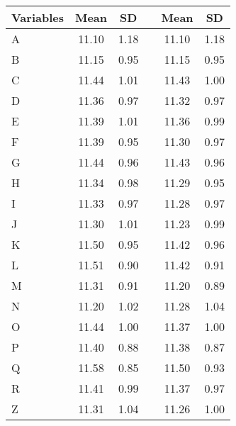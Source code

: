 \begin{tabular}{lccccc}
\toprule
    Variables &  Mean &   SD &  \multicolumn{1}{l}{} &  Mean &   SD \\
\midrule
\hspace{3mm}A & 11.10 & 1.18 &                       & 11.10 & 1.18 \\
\hspace{3mm}B & 11.15 & 0.95 &                       & 11.15 & 0.95 \\
\hspace{3mm}C & 11.44 & 1.01 &                       & 11.43 & 1.00 \\
\hspace{3mm}D & 11.36 & 0.97 &                       & 11.32 & 0.97 \\
\hspace{3mm}E & 11.39 & 1.01 &                       & 11.36 & 0.99 \\
\hspace{3mm}F & 11.39 & 0.95 &                       & 11.30 & 0.97 \\
\hspace{3mm}G & 11.44 & 0.96 &                       & 11.43 & 0.96 \\
\hspace{3mm}H & 11.34 & 0.98 &                       & 11.29 & 0.95 \\
\hspace{3mm}I & 11.33 & 0.97 &                       & 11.28 & 0.97 \\
\hspace{3mm}J & 11.30 & 1.01 &                       & 11.23 & 0.99 \\
\hspace{3mm}K & 11.50 & 0.95 &                       & 11.42 & 0.96 \\
\hspace{3mm}L & 11.51 & 0.90 &                       & 11.42 & 0.91 \\
\hspace{3mm}M & 11.31 & 0.91 &                       & 11.20 & 0.89 \\
\hspace{3mm}N & 11.20 & 1.02 &                       & 11.28 & 1.04 \\
\hspace{3mm}O & 11.44 & 1.00 &                       & 11.37 & 1.00 \\
\hspace{3mm}P & 11.40 & 0.88 &                       & 11.38 & 0.87 \\
\hspace{3mm}Q & 11.58 & 0.85 &                       & 11.50 & 0.93 \\
\hspace{3mm}R & 11.41 & 0.99 &                       & 11.37 & 0.97 \\
\hspace{3mm}Z & 11.31 & 1.04 &                       & 11.26 & 1.00 \\
\bottomrule
\end{tabular}

